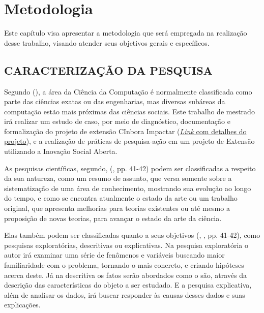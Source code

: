 \chapter{Metodologia}
\label{chap:metodologia}

Este capítulo visa apresentar a metodologia que será empregada na realização desse trabalho, visando atender seus objetivos gerais e específicos.

\section{CARACTERIZAÇÃO DA PESQUISA}
Segundo \citeauthor{wazlawick2014} (\citeyear{wazlawick2014}), a área da Ciência da Computação é normalmente classificada como parte das ciências exatas ou das engenharias, mas diversas subáreas da computação estão mais próximas das ciências sociais. Este trabalho de mestrado irá realizar um estudo de caso, por meio de diagnóstico, documentação e formalização do projeto de extensão CInbora Impactar (\href{https://sigaa.ufpe.br/sigaa/link/public/extensao/visualizacaoAcaoExtensao/1971}{\textit{Link} com detalhes do projeto}), e a realização de práticas de pesquisa-ação em um projeto de Extensão utilizando a Inovação Social Aberta.

As pesquisas científicas, segundo, \citeauthor{wazlawick2014} (\citeyear{wazlawick2014}, pp. 41-42) podem ser classificadas a respeito da sua natureza, como um resumo de assunto, que versa somente sobre a sistematização de uma área de conhecimento, mostrando sua evolução ao longo do tempo, e como se encontra atualmente o estado da arte ou um trabalho original, que apresenta melhorias para teorias existentes ou até mesmo a proposição de novas teorias, para avançar o estado da arte da ciência.

Elas também podem ser classificadas quanto a seus objetivos (\citeauthor{gil2002}, \citeyear{gil2002}, pp. 41-42), como pesquisas exploratórias, descritivas ou explicativas. Na pesquisa exploratória o autor irá examinar uma série de fenômenos e variáveis buscando maior familiaridade com o problema, tornando-o mais concreto, e criando hipóteses acerca deste. Já na descritiva os fatos serão abordados como o são, através da descrição das características do objeto a ser estudado. E a pesquisa explicativa, além de analisar os dados, irá buscar responder às causas desses dados e suas explicações.

